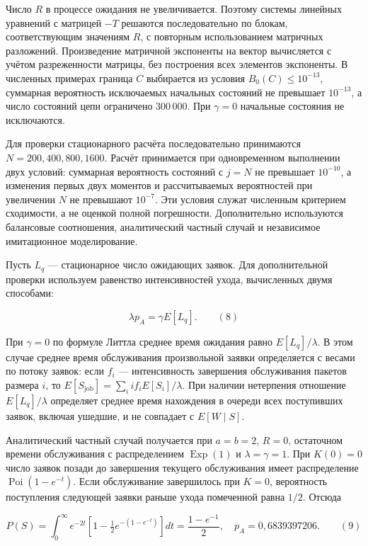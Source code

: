 Число $R$ в процессе ожидания не увеличивается. Поэтому системы линейных уравнений с матрицей $-T$ решаются последовательно по блокам, соответствующим значениям $R$, с повторным использованием матричных разложений. Произведение матричной экспоненты на вектор вычисляется с учётом разреженности матрицы, без построения всех элементов экспоненты. В численных примерах граница $C$ выбирается из условия $B_0(C)\leq10^{-13}$, суммарная вероятность исключаемых начальных состояний не превышает $10^{-13}$, а число состояний цепи ограничено 300\,000. При $\gamma=0$ начальные состояния не исключаются.

Для проверки стационарного расчёта последовательно принимаются $N=200,400,800,1600$. Расчёт принимается при одновременном выполнении двух условий: суммарная вероятность состояний с $j=N$ не превышает $10^{-10}$, а изменения первых двух моментов и рассчитываемых вероятностей при увеличении $N$ не превышают $10^{-7}$. Эти условия служат численным критерием сходимости, а не оценкой полной погрешности. Дополнительно используются балансовые соотношения, аналитический частный случай и независимое имитационное моделирование.

Пусть $L_q$ --- стационарное число ожидающих заявок. Для дополнительной проверки используем равенство интенсивностей ухода, вычисленных двумя способами:

\[\lambda p_A=\gamma E[L_q].\qquad (8)\]

При $\gamma=0$ по формуле Литтла среднее время ожидания равно $E[L_q]/\lambda$. В этом случае среднее время обслуживания произвольной заявки определяется с весами по потоку заявок: если $f_i$ --- интенсивность завершения обслуживания пакетов размера $i$, то $E[S_{\mathrm{job}}]=\sum_i i f_i E[S_i]/\lambda$. При наличии нетерпения отношение $E[L_q]/\lambda$ определяет среднее время нахождения в очереди всех поступивших заявок, включая ушедшие, и не совпадает с $E[W\mid S]$.

Аналитический частный случай получается при $a=b=2$, $R=0$, остаточном времени обслуживания с распределением $\operatorname{Exp}(1)$ и $\lambda=\gamma=1$. При $K(0)=0$ число заявок позади до завершения текущего обслуживания имеет распределение $\operatorname{Poi}(1-e^{-t})$. Если обслуживание завершилось при $K=0$, вероятность поступления следующей заявки раньше ухода помеченной равна $1/2$. Отсюда

\[P(S)=\int_0^\infty e^{-2t}\left[1-\tfrac12 e^{-(1-e^{-t})}\right]dt
 =\frac{1-e^{-1}}2,\quad p_A=0{,}6839397206.\qquad (9)\]


